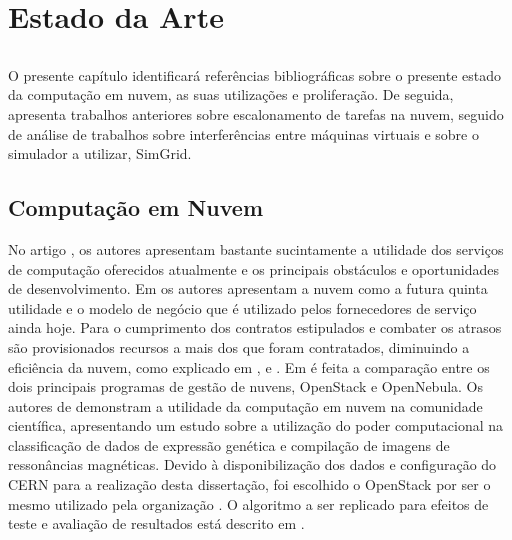 \chapter{Estado da Arte} \label{chap:sota}

\section*{}

O presente capítulo identificará referências bibliográficas sobre o presente estado da computação em nuvem, as suas utilizações e proliferação. De seguida, apresenta trabalhos anteriores sobre escalonamento de tarefas na nuvem, seguido de análise de trabalhos sobre interferências entre máquinas virtuais e sobre o simulador a utilizar, SimGrid. 



\section{Computação em Nuvem}

No artigo \cite{armbrust2010view}, os autores apresentam bastante sucintamente a utilidade dos serviços de computação oferecidos atualmente e os principais obstáculos e oportunidades de desenvolvimento. Em \cite{buyya2009cloud} os autores apresentam a nuvem como a futura quinta utilidade e o modelo de negócio que é utilizado pelos fornecedores de serviço ainda hoje. Para o cumprimento dos contratos estipulados e combater os atrasos são provisionados recursos a mais dos que foram contratados, diminuindo a eficiência da nuvem, como explicado em \cite{armbrust2010view}, \cite{nathuji2010q} e \cite{corradi2012vm}. Em \cite{wen2012comparison} é feita a comparação entre os dois principais programas de gestão de nuvens, OpenStack e OpenNebula. Os autores de \cite{vecchiola2009high} demonstram a utilidade da computação em nuvem na comunidade científica, apresentando um estudo sobre a utilização do poder computacional na classificação de dados de expressão genética e compilação de imagens de ressonâncias magnéticas. Devido à disponibilização dos dados e configuração do CERN para a realização desta dissertação, foi escolhido o OpenStack por ser o mesmo utilizado pela organização \cite{openstackcern}. O algoritmo a ser replicado para efeitos de teste e avaliação de resultados está descrito em \cite{gong2012nova}.

